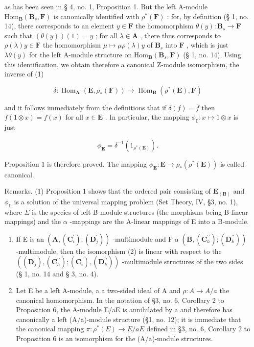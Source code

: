 as has been seen in § 4, no. 1, Proposition 1. But the left A-module \(\mathrm{Hom}_{\mathbf{B}}(\mathbf{B}_{s},\mathbf{F})\) is canonically identified with \(\rho^{*}(\mathbf{F})\) : for, by definition (§ 1, no. 14), there corresponds to an element \(y\in \mathbf{F}\) the homomorphism \(\theta (y)\colon \mathbf{B}_s\to \mathbf{F}\) such that \((\theta (y))(1) = y\) ; for all \(\lambda \in \mathbf{A}\) , there thus corresponds to \(\rho (\lambda)y\in \mathbf{F}\) the homomorphism \(\mu \mapsto \mu \rho (\lambda)y\) of \(\mathbf{B}_s\) into \(\mathbf{F}\) , which is just \(\lambda \theta (y)\) for the left A-module structure on \(\mathrm{Hom}_{\mathbf{B}}(\mathbf{B}_{s},\mathbf{F})\) (§ 1, no. 14). Using this identification, we obtain therefore a canonical Z-module isomorphism, the inverse of (1)

\[
\delta : \operatorname{Hom} _ {\mathbf {A}} (\mathbf {E}, \rho_ {*} (\mathbf {F})) \rightarrow \operatorname{Hom} _ {\mathbf {B}} (\rho^ {*} (\mathbf {E}), \mathbf {F})\tag{2}
\]

and it follows immediately from the definitions that if \(\delta(f) = \bar{f}\) then \(\bar{f}(1 \otimes x) = f(x)\) for all \(x \in \mathbf{E}\) . In particular, the mapping \(\phi_{\mathbb{E}}: x \mapsto 1 \otimes x\) is just

\[
\phi_ {\mathbf {E}} = \delta^ {- 1} (1 _ {\rho^ {*} (\mathbf {E})}).\tag{3}
\]

Proposition 1 is therefore proved. The mapping \(\phi_{\mathbf{E}}: \mathbf{E} \to \rho_{*}(\rho^{*}(\mathbf{E}))\) is called canonical.

Remarks. (1) Proposition 1 shows that the ordered pair consisting of \(\mathbf{E}_{(\mathbf{B})}\) and \(\phi_{\mathbb{E}}\) is a solution of the universal mapping problem (Set Theory, IV, §3, no. 1), where \(\Sigma\) is the species of left B-module structures (the morphisms being B-linear mappings) and the \(\alpha\) -mappings are the A-linear mappings of E into a B-module.

\begin{enumerate}
\def\labelenumi{(\arabic{enumi})}
\setcounter{enumi}{1}
\item
  If E is an \((\mathbf{A}, (\mathbf{C}_{i}^{\prime}); (\mathbf{D}_{j}^{\prime}))\) -multimodule and F a \((\mathbf{B}, (\mathbf{C}_{h}^{\prime\prime}); (\mathbf{D}_{k}^{\prime\prime}))\) -multimodule, then the isomorphism (2) is linear with respect to the \(((\mathbf{D}_{j}^{\prime}), (\mathbf{C}_{h}^{\prime\prime}); (\mathbf{C}_{i}^{\prime}), (\mathbf{D}_{k}^{\prime\prime}))\) -multimodule structures of the two sides (§ 1, no. 14 and § 3, no. 4).
\item
  Let E be a left A-module, a a two-sided ideal of A and \(\rho:A\to A/a\) the canonical homomorphism. In the notation of §3, no. 6, Corollary 2 to Proposition 6, the A-module E/aE is annihilated by a and therefore has canonically a left (A/a)-module structure (§1, no. 12); it is immediate that the canonical mapping \(\pi:\rho^{*}(E)\to E/aE\) defined in §3, no. 6, Corollary 2 to Proposition 6 is an isomorphism for the (A/a)-module structures.
\end{enumerate}


